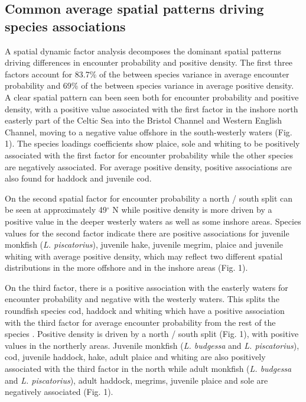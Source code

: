 \documentclass{nature}
\begin{document}
\begin{linenumbers}
\subsection{Common average spatial patterns driving species associations} A
spatial dynamic factor analysis decomposes the dominant spatial patterns
driving differences in encounter probability and positive density. The first
three factors account for 83.7\% of the between
species variance in average encounter probability and 69\% of the between
species variance in average positive density. A clear spatial pattern can been
seen both for encounter probability and positive density, with a positive value
associated with the first factor in the inshore north easterly part of the
Celtic Sea into the Bristol Channel and Western English Channel, moving to a
negative value offshore in the south-westerly waters (Fig. 1).  The species
loadings coefficients show plaice, sole and whiting to be positively associated
with the first factor for encounter probability while the other species are
negatively associated. For average positive density, positive associations are
also found for haddock and juvenile cod.  

On the second spatial factor for encounter probability a north / south split
can be seen at approximately 49$^{\circ}$ N while positive density is more
driven by a positive value in the deeper westerly waters as well as some
inshore areas. Species values for the second factor indicate there are positive
associations for juvenile monkfish (\emph{L. piscatorius}), juvenile hake,
juvenile megrim, plaice and juvenile whiting with average positive density,
which may reflect two different spatial distributions in the more offshore and
in the inshore areas (Fig. 1).

On the third factor, there is a positive association with the easterly waters
for encounter probability and negative with the westerly waters. This
 splits the
roundfish species cod, haddock and whiting which have a positive
association with the third factor for average encounter probability from the
rest of the species .  Positive
density is driven by a north / south split (Fig. 1), with positive values in
the northerly areas. Juvenile monkfish (\emph{L.  budgessa} and \emph{L.
	piscatorius}), cod, juvenile haddock, hake, adult plaice and whiting
are also positively associated with the third factor in the north while adult
monkfish (\emph{L. budgessa} and \emph{L.  piscatorius}), adult haddock,
megrims, juvenile plaice and sole are negatively associated  (Fig. 1).


\end{linenumbers}
\end{document}
